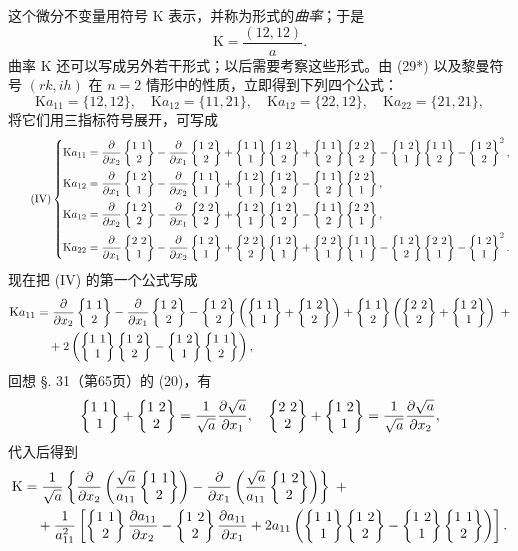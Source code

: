 这个微分不变量用符号 $\mathrm K$ 表示，并称为形式的\emph{曲率}；于是
\begin{equation}\tag{32}
\mathrm K=\frac{(12,12)}{a}.
\end{equation}
曲率 $\mathrm K$ 还可以写成另外若干形式；以后需要考察这些形式。由 (29*) 以及黎曼符号 $(rk,ih)$ 在 $n=2$ 情形中的性质，立即得到下列四个公式：
\[
\mathrm K a_{11}=\{12,12\},\quad \mathrm K a_{12}=\{11,21\},\quad \mathrm K a_{12}=\{22,12\},\quad \mathrm K a_{22}=\{21,21\},
\]
将它们用三指标符号展开，可写成
\begingroup\small
\begin{equation}\tag{IV}
\left\{
\begin{aligned}
\mathrm K a_{11}&=\frac{\partial}{\partial x_2}\chrtwo{1}{1}{2}-\frac{\partial}{\partial x_1}\chrtwo{1}{2}{2}
+\chrtwo{1}{1}{1}\chrtwo{1}{2}{2}+\chrtwo{1}{1}{2}\chrtwo{2}{2}{2}-\chrtwo{1}{2}{1}\chrtwo{1}{1}{2}-\chrtwo{1}{2}{2}^{2},\\
\mathrm K a_{12}&=\frac{\partial}{\partial x_1}\chrtwo{1}{2}{1}-\frac{\partial}{\partial x_2}\chrtwo{1}{1}{1}
+\chrtwo{1}{2}{1}\chrtwo{1}{2}{2}-\chrtwo{1}{1}{2}\chrtwo{2}{2}{1},\\
\mathrm K a_{12}&=\frac{\partial}{\partial x_2}\chrtwo{1}{2}{2}-\frac{\partial}{\partial x_1}\chrtwo{2}{2}{2}
+\chrtwo{1}{2}{1}\chrtwo{1}{2}{2}-\chrtwo{1}{1}{2}\chrtwo{2}{2}{1},\\
\mathrm K a_{22}&=\frac{\partial}{\partial x_1}\chrtwo{2}{2}{1}-\frac{\partial}{\partial x_2}\chrtwo{1}{2}{1}
+\chrtwo{2}{2}{2}\chrtwo{1}{2}{1}+\chrtwo{2}{2}{1}\chrtwo{1}{1}{1}-\chrtwo{1}{2}{2}\chrtwo{2}{2}{1}-\chrtwo{1}{2}{1}^{2}.
\end{aligned}
\right.
\end{equation}
\endgroup
现在把 (IV) 的第一个公式写成
\[
\begin{aligned}
\mathrm K a_{11}&=\frac{\partial}{\partial x_2}\chrtwo{1}{1}{2}-\frac{\partial}{\partial x_1}\chrtwo{1}{2}{2}
-\chrtwo{1}{2}{2}\left(\chrtwo{1}{1}{1}+\chrtwo{1}{2}{2}\right)
+\chrtwo{1}{1}{2}\left(\chrtwo{2}{2}{2}+\chrtwo{1}{2}{1}\right)\;+\\
&\quad+2\left(\chrtwo{1}{1}{1}\chrtwo{1}{2}{2}-\chrtwo{1}{2}{1}\chrtwo{1}{1}{2}\right),
\end{aligned}
\]
回想 §. 31（第65页）的 (20)，有
\[
\chrtwo{1}{1}{1}+\chrtwo{1}{2}{2}=\frac{1}{\sqrt a}\frac{\partial\sqrt a}{\partial x_1},\quad
\chrtwo{2}{2}{2}+\chrtwo{1}{2}{1}=\frac{1}{\sqrt a}\frac{\partial\sqrt a}{\partial x_2},
\]
代入后得到
\[
\begin{aligned}
\mathrm K&=\frac{1}{\sqrt a}\left\{\frac{\partial}{\partial x_2}\left(\frac{\sqrt a}{a_{11}}\chrtwo{1}{1}{2}\right)
-\frac{\partial}{\partial x_1}\left(\frac{\sqrt a}{a_{11}}\chrtwo{1}{2}{2}\right)\right\}\;+\\
&\quad+\frac{1}{a_{11}^{2}}\left[\chrtwo{1}{1}{2}\frac{\partial a_{11}}{\partial x_2}-\chrtwo{1}{2}{2}\frac{\partial a_{11}}{\partial x_1}
+2a_{11}\left(\chrtwo{1}{1}{1}\chrtwo{1}{2}{2}-\chrtwo{1}{2}{1}\chrtwo{1}{1}{2}\right)\right].
\end{aligned}
\]
